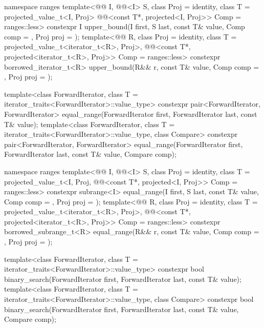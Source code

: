 \begin{codeblock}
{  namespace ranges {
    template<@@ I, @@<I> S, class Proj = identity,
             class T = projected_value_t<I, Proj>
             @@<const T*, projected<I, Proj>> Comp = ranges::less>
      constexpr I upper_bound(I first, S last, const T& value, Comp comp = {}, Proj proj = {});
    template<@@ R, class Proj = identity,
             class T = projected_value_t<iterator_t<R>, Proj>,
             @@<const T*, projected<iterator_t<R>, Proj>> Comp =
               ranges::less>
      constexpr borrowed_iterator_t<R>
        upper_bound(R&& r, const T& value, Comp comp = {}, Proj proj = {});
  }

  template<class ForwardIterator, class T = iterator_traits<ForwardIterator>::value_type>
    constexpr pair<ForwardIterator, ForwardIterator>
      equal_range(ForwardIterator first, ForwardIterator last,
                  const T& value);
  template<class ForwardIterator, class T = iterator_traits<ForwardIterator>::value_type,
           class Compare>
    constexpr pair<ForwardIterator, ForwardIterator>
      equal_range(ForwardIterator first, ForwardIterator last,
                  const T& value, Compare comp);

  namespace ranges {
    template<@@ I, @@<I> S, class Proj = identity,
             class T = projected_value_t<I, Proj,
             @@<const T*, projected<I, Proj>> Comp = ranges::less>
      constexpr subrange<I>
        equal_range(I first, S last, const T& value, Comp comp = {}, Proj proj = {});
    template<@@ R, class Proj = identity,
             class T = projected_value_t<iterator_t<R>, Proj>,
             @@<const T*, projected<iterator_t<R>, Proj>> Comp =
               ranges::less>
      constexpr borrowed_subrange_t<R>
        equal_range(R&& r, const T& value, Comp comp = {}, Proj proj = {});
  }

  template<class ForwardIterator, class T = iterator_traits<ForwardIterator>::value_type>
    constexpr bool
      binary_search(ForwardIterator first, ForwardIterator last,
                    const T& value);
  template<class ForwardIterator, class T = iterator_traits<ForwardIterator>::value_type,
           class Compare>
    constexpr bool
      binary_search(ForwardIterator first, ForwardIterator last,
                    const T& value, Compare comp);

}
\end{codeblock}
